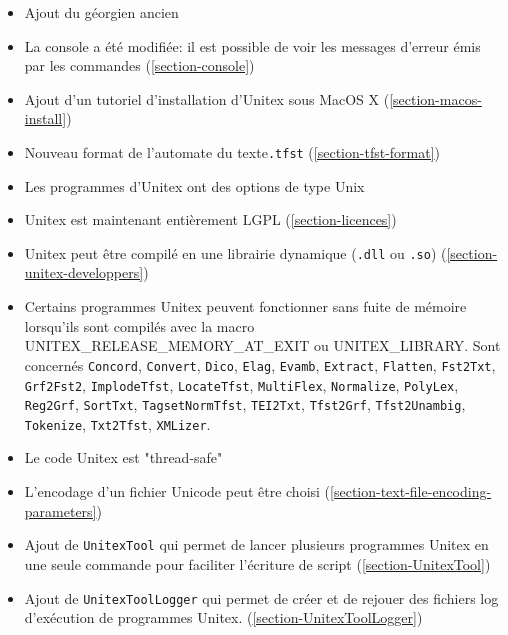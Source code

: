 \begin{itemize}
\item Ajout du géorgien ancien
  	  
  \item La console a été modifiée: il est possible de voir les messages d'erreur émis par les
  	  commandes
        (\ref{section-console})
  \item Ajout d'un tutoriel d'installation d'Unitex sous MacOS X 
       (\ref{section-macos-install})
       
  \item Nouveau format de l'automate du texte\verb+.tfst+ (\ref{section-tfst-format})
  	  
  \item Les programmes d'Unitex ont des options de type Unix
  	  
  \item Unitex est maintenant entièrement LGPL (\ref{section-licences})
  	  
  \item Unitex peut être compilé en une librairie dynamique (\verb$.dll$ ou \verb$.so$)
  (\ref{section-unitex-developpers})
  
\item Certains programmes Unitex peuvent fonctionner sans fuite de mémoire lorsqu'ils sont compilés
  	  avec la macro UNITEX\_RELEASE\_MEMORY\_AT\_EXIT ou UNITEX\_LIBRARY.
  Sont concernés \verb$Concord$, \verb$Convert$, \verb$Dico$, \verb$Elag$, \verb$Evamb$,
  \verb$Extract$, \verb$Flatten$, \verb$Fst2Txt$, \verb$Grf2Fst2$, \verb$ImplodeTfst$,
  \verb$LocateTfst$, \verb$MultiFlex$, \verb$Normalize$, \verb$PolyLex$, \verb$Reg2Grf$,
  \verb$SortTxt$, \verb$TagsetNormTfst$, \verb$TEI2Txt$, \verb$Tfst2Grf$, \verb$Tfst2Unambig$,
  \verb$Tokenize$, \verb$Txt2Tfst$, \verb$XMLizer$.
  
  \item Le code Unitex est "thread-safe"
  	  
  \item L'encodage d'un fichier Unicode peut être choisi
  	  (\ref{section-text-file-encoding-parameters})
  	  
  \item Ajout de \verb$UnitexTool$ qui permet de lancer plusieurs
   programmes Unitex en une seule commande pour faciliter l'écriture de script
   (\ref{section-UnitexTool})
  
  \item Ajout de \verb$UnitexToolLogger$ qui permet de créer et de rejouer des fichiers log
  d'exécution de programmes Unitex. (\ref{section-UnitexToolLogger})
  

\end{itemize}
